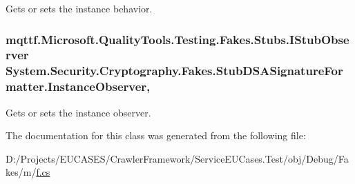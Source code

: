 Gets or sets the instance behavior.

\hypertarget{class_system_1_1_security_1_1_cryptography_1_1_fakes_1_1_stub_d_s_a_signature_formatter_a633c09b7625f7c979a27f75087bb0048}{
\subsubsection[{Instance\-Observer}]{\setlength{\rightskip}{0pt plus 5cm}mqttf.\-Microsoft.\-Quality\-Tools.\-Testing.\-Fakes.\-Stubs.\-I\-Stub\-Observer System.\-Security.\-Cryptography.\-Fakes.\-Stub\-D\-S\-A\-Signature\-Formatter.\-Instance\-Observer\hspace{0.3cm}{\ttfamily [get]}, {\ttfamily [set]}}}\label{class_system_1_1_security_1_1_cryptography_1_1_fakes_1_1_stub_d_s_a_signature_formatter_a633c09b7625f7c979a27f75087bb0048}


Gets or sets the instance observer.



The documentation for this class was generated from the following file\-:\begin{DoxyCompactItemize}
\item 
D\-:/\-Projects/\-E\-U\-C\-A\-S\-E\-S/\-Crawler\-Framework/\-Service\-E\-U\-Cases.\-Test/obj/\-Debug/\-Fakes/m/\hyperlink{m_2f_8cs}{f.\-cs}\end{DoxyCompactItemize}
